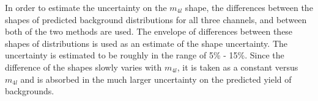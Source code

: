 In order to estimate the uncertainty on the $m_{4l}$ shape, the  differences between the shapes of predicted background distributions for all three channels, and between both of the two methods are used. The envelope of differences between these shapes of distributions is used as an estimate of the shape uncertainty. The uncertainty is estimated to be roughly in the range of 5\% - 15\%. Since the difference of the shapes slowly varies with $m_{4l}$, it is taken as a constant versus $m_{4l}$  and is absorbed in the much larger uncertainty on the predicted yield of backgrounds.



















